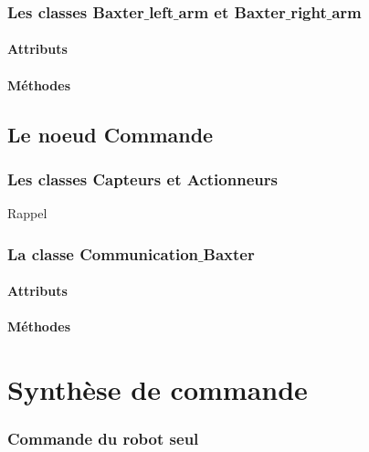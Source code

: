 \documentclass[a4paper,french, titlepage]{book}
\begin{document}
\subsection{Les classes Baxter$\_$left$\_$arm et Baxter$\_$right$\_$arm}

\subsubsection{Attributs}

\subsubsection{Méthodes}


\section{Le noeud Commande}

\subsection{Les classes Capteurs et Actionneurs}

Rappel

\subsection{La classe Communication$\_$Baxter}

\subsubsection{Attributs}

\subsubsection{Méthodes}







\newpage
\chapter{Synthèse de commande}

\subsection{Commande du robot seul}
\end{document}

